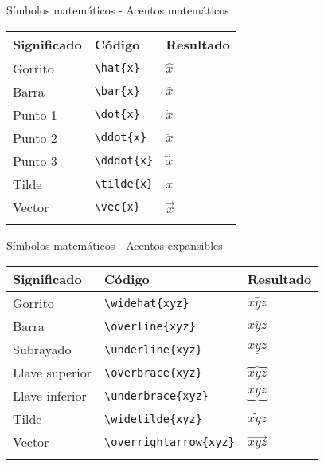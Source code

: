 \documentclass[
  ignorenonframetext,
]{beamer}
\begin{document}
\begin{frame}[fragile]{Símbolos matemáticos - Acentos matemáticos}
\label{suxedmbolos-matemuxe1ticos---acentos-matemuxe1ticos}
\begin{longtable}[]{@{}lll@{}}
\toprule\noalign{}
Significado & Código & Resultado \\
\midrule\noalign{}
\endhead
Gorrito & \texttt{\textbackslash{}hat\{x\}} & \(\hat{x}\) \\
Barra & \texttt{\textbackslash{}bar\{x\}} & \(\bar{x}\) \\
Punto 1 & \texttt{\textbackslash{}dot\{x\}} & \(\dot{x}\) \\
Punto 2 & \texttt{\textbackslash{}ddot\{x\}} & \(\ddot{x}\) \\
Punto 3 & \texttt{\textbackslash{}dddot\{x\}} & \(\dddot{x}\) \\
Tilde & \texttt{\textbackslash{}tilde\{x\}} & \(\tilde{x}\) \\
Vector & \texttt{\textbackslash{}vec\{x\}} & \(\vec{x}\) \\
\bottomrule\noalign{}
\end{longtable}
\end{frame}

\begin{frame}[fragile]{Símbolos matemáticos - Acentos expansibles}
\label{suxedmbolos-matemuxe1ticos---acentos-expansibles}
\begin{longtable}[]{@{}lll@{}}
\toprule\noalign{}
Significado & Código & Resultado \\
\midrule\noalign{}
\endhead
Gorrito & \texttt{\textbackslash{}widehat\{xyz\}} & \(\widehat{xyz}\) \\
Barra & \texttt{\textbackslash{}overline\{xyz\}} & \(\overline{xyz}\) \\
Subrayado & \texttt{\textbackslash{}underline\{xyz\}} &
\(\underline{xyz}\) \\
Llave superior & \texttt{\textbackslash{}overbrace\{xyz\}} &
\(\overbrace{xyz}\) \\
Llave inferior & \texttt{\textbackslash{}underbrace\{xyz\}} &
\(\underbrace{xyz}\) \\
Tilde & \texttt{\textbackslash{}widetilde\{xyz\}} &
\(\widetilde{xyz}\) \\
Vector & \texttt{\textbackslash{}overrightarrow\{xyz\}} &
\(\overrightarrow{xyz}\) \\
\bottomrule\noalign{}
\end{longtable}
\end{frame}
\end{document}
